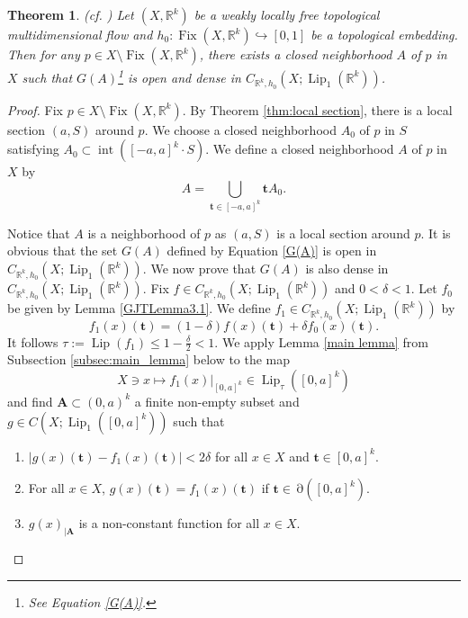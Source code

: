 \documentclass[11pt]{article}
\theoremstyle{plain}
\newtheorem{thm}{Theorem}[section]
\theoremstyle{definition}
\DeclareMathOperator{\Lip}{Lip}
\DeclareMathOperator{\Fix}{Fix}
\DeclareMathOperator{\Int}{int}
\DeclareMathOperator{\Edge}{\partial}
\def\Rk{\mathbb{R}^k}
\def\tt{\mathbf t}
\def\AA{\mathbf A}
\numberwithin{figure}{section}
\begin{document}
\begin{thm}\label{Rkdense1}(cf. \cite[Lemma 3.3]{GJT19})
Let $(X,\Rk)$ be a  weakly locally free topological multidimensional flow and  $h_0:\Fix(X,\Rk)\hookrightarrow[0,1]$ be a topological  embedding.  
Then for any $p\in X\setminus\Fix(X,\Rk)$, there exists a closed neighborhood $A$ of $p$ in $X$ such that $G(A)$\footnote{See Equation \eqref{G(A)}.}
is open and dense in $C_{\Rk,h_0}(X;\Lip_{1}(\Rk))$.
\end{thm}
\begin{proof}
    Fix $p\in X\setminus\Fix(X,\Rk)$. By Theorem \ref{thm:local section}, there is a local section $(a,S)$ around $p$. We choose a closed neighborhood $A_0$ of $p$ in $S$ satisfying $A_0\subset\Int([-a,a]^k\cdot S)$. We define a closed neighborhood $A$ of $p$ in $X$ by
    \begin{equation*}
        A=\bigcup\limits_{\tt\in[-a,a]^k} \tt A_0.
    \end{equation*}
       
\noindent   Notice that $A$ is a neighborhood of $p$ as $(a,S)$ is a local section around $p$.  It is obvious that the set $G(A)$ defined by Equation \eqref{G(A)} is open in $C_{\Rk,h_0}(X;\Lip_{1}(\Rk))$. We now prove that $G(A)$ is also dense in $C_{\Rk,h_0}(X;\Lip_{1}(\Rk))$. 
     Fix $f\in C_{\Rk,h_0}(X;\Lip_{1}(\Rk))$ and $0<\delta<1$. Let $f_0$ be given by Lemma \ref{GJTLemma3.1}. We define $f_1\in C_{\Rk,h_0}(X;\Lip_{1}(\Rk))$ by
    \begin{equation}\label{delta perturb}
        f_1(x)(\tt)=(1-\delta)f(x)(\tt)+\delta f_0(x)(\tt).
    \end{equation}
    It follows $\tau:=\Lip(f_1)\leq1-\frac{\delta}{2}<1$. We apply Lemma \ref{main lemma} from Subsection \ref{subsec:main_lemma} below  to the map
    \begin{equation*}
        X\ni x\mapsto f_1(x)|_{[0,a]^k}\in\Lip_{\tau}([0,a]^k)
    \end{equation*}
    and find $\AA \subset (0,a)^k$ a finite non-empty subset and $g\in C(X;\Lip_{1}([0,a]^k))$ such that
    \begin{enumerate}[$(1)$]
    \item  $|g(x)(\tt)-f_1(x)(\tt)|<2\delta$ for all $x\in X$ and $\mathbf t\in[0,a]^k$.
    \item  For all $x\in X$, $g(x)(\tt)=f_1(x)(\tt)$ if $\mathbf t\in\Edge([0,a]^k)$.
   \item $g(x)_{|\AA}$ is a non-constant function for all $x\in X$.
    \end{enumerate}


\end{proof}
\end{document}
